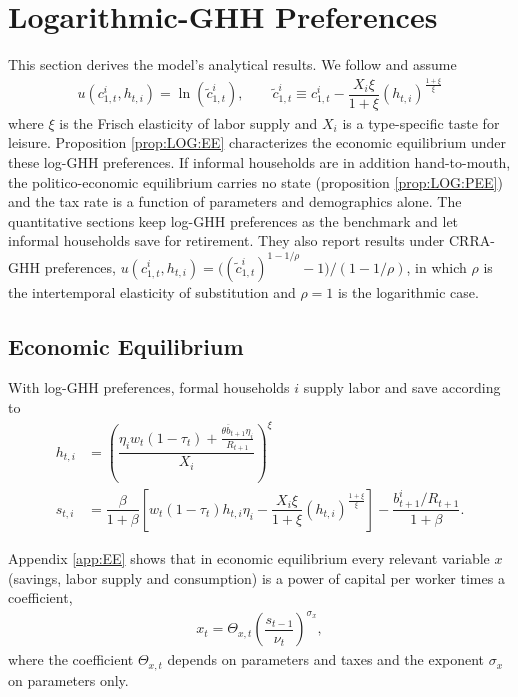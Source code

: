 \section{Logarithmic-GHH Preferences}\label{sec:LOG}
This section derives the model's analytical results. We follow \textcite{GreenwoodHH88a1} and assume
\begin{align}
    u(c_{1,t}^i,h_{t,i})= \ln\left(\tilde{c}_{1,t}^i\right), \qquad \tilde{c}_{1,t}^i \equiv c_{1,t}^i - \dfrac{X_i\xi}{1+\xi}\left(h_{t,i}\right)^{\frac{1+\xi}{\xi}}
\end{align}
where $\xi$ is the Frisch elasticity of labor supply and $X_i$ is a type-specific taste for leisure. Proposition \ref{prop:LOG:EE} characterizes the economic equilibrium under these log-GHH preferences. If informal households are in addition hand-to-mouth, the politico-economic equilibrium carries no state (proposition \ref{prop:LOG:PEE}) and the tax rate is a function of parameters and demographics alone. The quantitative sections keep log-GHH preferences as the benchmark and let informal households save for retirement. They also report results under CRRA-GHH preferences, $u(c_{1,t}^i,h_{t,i}) = \big((\tilde{c}_{1,t}^i)^{1-1/\rho}-1\big)/(1-1/\rho)$, in which $\rho$ is the intertemporal elasticity of substitution and $\rho = 1$ is the logarithmic case.


\subsection{Economic Equilibrium}

With log-GHH preferences, formal households $i$ supply labor and save according to
\begin{subequations}\label{eq:LOG:formalSol_i}
\begin{align}
    h_{t,i} &= \left(\dfrac{\eta_iw_t(1-\tau_t)+\frac{\theta \overline{b}_{t+1} \eta_i}{R_{t+1}}}{X_i}\right)^{\xi} \\
    s_{t,i} &= \dfrac{\beta}{1+\beta}\left[w_t\left(1-\tau_t\right)h_{t,i}\eta_{i}-\dfrac{X_{i}\xi}{1+\xi}\left(h_{t,i}\right)^{\frac{1+\xi}{\xi}}\right]-\dfrac{b_{t+1}^i/R_{t+1}}{1+\beta}.
\end{align}
\end{subequations}


Appendix \ref{app:EE} shows that in economic equilibrium every relevant variable $x$ (savings, labor supply and consumption) is a power of capital per worker times a coefficient,
\begin{align*}
    x_t = \Theta_{x,t} \left(\dfrac{s_{t-1}}{\nu_t}\right)^{\sigma_x},
\end{align*}
where the coefficient $\Theta_{x,t}$ depends on parameters and taxes and the exponent $\sigma_x$ on parameters only.

